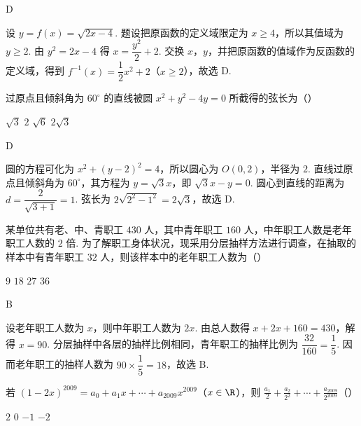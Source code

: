 \begin{answer}
D
\end{answer}

\begin{solution}
设 \(y=f(x)=\sqrt{2x-4}\). 题设把原函数的定义域限定为 \(x\geqslant 4\)，所以其值域为 \(y\geqslant 2\). 由 \(y^{2}=2x-4\) 得 \(x=\dfrac{y^{2}}{2}+2\). 交换 \(x\)，\(y\)，并把原函数的值域作为反函数的定义域，得到 \(f^{-1}(x)=\dfrac{1}{2}x^{2}+2\)（\(x\geqslant 2\)），故选 D.
\end{solution}

\begin{problem}
过原点且倾斜角为 \(60^{\circ}\) 的直线被圆 \(x^{2} + y^{2} - 4y = 0\) 所截得的弦长为（\quad）

\choices
    {\(\sqrt{3}\)}
    {\(2\)}
    {\( \sqrt{6} \)}
    {\(2\sqrt{3}\)}
\end{problem}

\begin{answer}
D
\end{answer}

\begin{solution}
圆的方程可化为 \(x^{2}+(y-2)^{2}=4\)，所以圆心为 \(O(0,2)\)，半径为 \(2\). 直线过原点且倾斜角为 \(60^{\circ}\)，其方程为 \(y=\sqrt{3}x\)，即 \(\sqrt{3}x-y=0\). 圆心到直线的距离为 \(d=\dfrac{2}{\sqrt{3+1}}=1\). 弦长为 \(2\sqrt{2^{2}-1^{2}}=2\sqrt{3}\)，故选 D.
\end{solution}

\begin{problem}
某单位共有老、中、青职工 \(430\) 人，其中青年职工 \(160\) 人，中年职工人数是老年职工人数的 \(2\) 倍. 为了解职工身体状况，现采用分层抽样方法进行调查，在抽取的样本中有青年职工 \(32\) 人，则该样本中的老年职工人数为（\quad）

\choices
    {\(9\)}
    {\(18\)}
    {\(27\)}
    {\(36\)}
\end{problem}

\begin{answer}
B
\end{answer}

\begin{solution}
设老年职工人数为 \(x\)，则中年职工人数为 \(2x\). 由总人数得 \(x+2x+160=430\)，解得 \(x=90\). 分层抽样中各层的抽样比例相同，青年职工的抽样比例为 \(\dfrac{32}{160}=\dfrac{1}{5}\). 因而老年职工的抽样人数为 \(90\times\dfrac{1}{5}=18\)，故选 B.
\end{solution}

\begin{problem}
若 \( (1-2x)^{2009}=a_{0}+a_{1}x+\cdots+a_{2009}x^{2009} \)（\(x\in\R\)），则 \( \frac{a_{1}}{2}+\frac{a_{2}}{2^{2}}+\cdots+\frac{a_{2009}}{2^{2009}} \)（\quad）

\choices
    {\(2\)}
    {\(0\)}
    {\(-1\)}
    {\(-2\)}
\end{problem}


